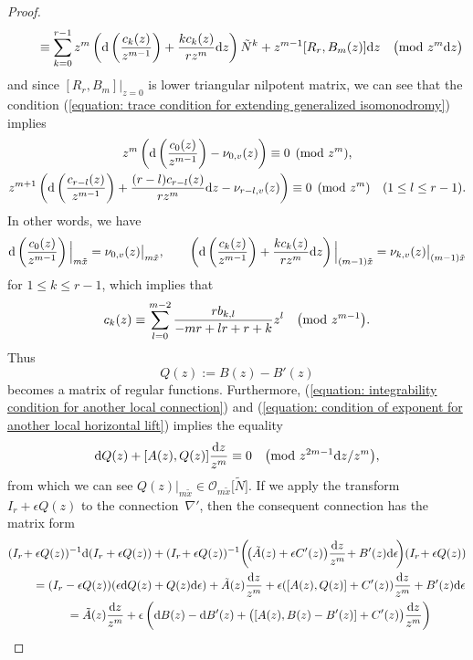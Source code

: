 \documentclass[pdftex]{sigma}
\numberwithin{equation}{section}
\begin{document}
\begin{proof}
\begin{gather*}
\qquad{} \equiv
 \sum_{k=0}^{r-1} z^m \left( {\rm d}\left( \frac{c_k(z)} {z^{m-1}}\right)
 +\frac {kc_k(z) } {rz^m}{\rm d}z \right) \tilde{N}^k
 +z^{m-1}[R_r,B_m(z)] {\rm d}z \quad \big({\rm mod} \ z^m {\rm d}z\big)
\end{gather*}
and since
$[R_r,B_m]|_{z=0}$ is lower triangular nilpotent matrix,
we can see that the condition
(\ref{equation: trace condition for extending generalized isomonodromy})
implies
\begin{gather*}
 z^m \left( {\rm d}\left( \frac{c_0(z)} {z^{m-1}}\right) -\nu_{0,v}(z)\right)
\equiv 0
 \pmod{z^m},
 \\
 z^{m+1} \left( {\rm d}\left( \frac{c_{r-l}(z)} {z^{m-1}}\right)
 +\frac {(r-l)c_{r-l}(z) } {rz^m}{\rm d}z -\nu_{r-l,v}(z)\right)
 \equiv 0
 \pmod{z^m} \quad
 (1\leq l\leq r-1).
\end{gather*}
In other words, we have
\[
{\rm d}\left( \frac{c_0(z)} {z^{m-1}} \right)\Big|_{m\tilde{x}}
 = \nu_{0,v}(z)\big|_{m\tilde{x}},
\qquad
 \left( {\rm d}\left( \frac{c_k(z)} {z^{m-1}}\right)
 +\frac {kc_k(z) } {rz^m}{\rm d}z\right)\Big|_{(m-1)\tilde{x}}
 = \nu_{k,v}(z) \big|_{(m-1)\tilde{x}}
\]
for $1\leq k\leq r-1$,
which implies that
\[
 c_k(z)\equiv \sum_{l=0}^{m-2} \frac{rb_{k,l}}{-mr+lr+r+k} z^l
 \quad \big({\rm mod} \ z^{m-1}\big).
\]
Thus
\[
 Q(z):=
 B(z)-B'(z)
\]
becomes
a matrix of regular functions.
Furthermore, (\ref{equation: integrability condition for another local connection})
and (\ref{equation: condition of exponent for another local horizontal lift})
implies the equality
\[
{\rm d}Q(z)+[A(z),Q(z)]\frac{{\rm d}z}{z^m}
 \equiv
 0 \quad \big({\rm mod} \ z^{2m-1}{\rm d}z/z^m \big),
\]
from which we can see
$Q(z)|_{m\tilde{x}} \in {\mathcal O}_{m\tilde{x}}\big[\tilde{N}\big]$.
If we apply the transform
$I_r+\epsilon Q(z)$ to the connection~$\nabla'$,
then the consequent connection has the matrix form
\begin{gather*}
 (I_r\!+\epsilon Q(z))^{-1}
 {\rm d} (I_r+\epsilon Q(z))
 +
 (I_r\!+\epsilon Q(z))^{-1}\!
 \left( \!\big( \tilde{A}(z) + \epsilon C'(z) \big) \frac {{\rm d}z} {z^m}\!
 + B'(z) {\rm d}\epsilon \!\right)\!
 (I_r\!+\epsilon Q(z))
 \\
\qquad{} =
 (I_r-\epsilon Q(z))(\epsilon {\rm d}Q(z)+Q(z) {\rm d}\epsilon)
 +\tilde{A}(z)\frac{{\rm d}z}{z^m} +\epsilon ([A(z),Q(z)]+C'(z) )\frac{{\rm d}z}{z^m}
 +B'(z){\rm d}\epsilon
 \\
\qquad{} =
 \tilde{A}(z)\frac{{\rm d}z} {z^m}
 +\epsilon \left( {\rm d}B(z)-{\rm d}B'(z)
 +\big([A(z),B(z)-B'(z)]+C'(z)\big) \frac{{\rm d}z} {z^m} \right)\\

\end{gather*}
\end{proof}
\end{document}
